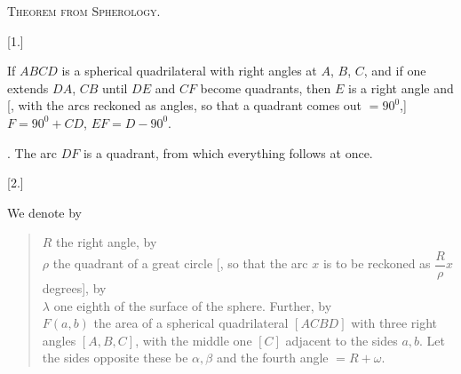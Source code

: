 \clearpage
{}%
\begin{center}
{\Large\textsc{Theorem from Spherology.}}
\end{center}

\begin{center}\begin{minipage}{\linewidth}\centering\end{minipage}\end{center}

[1.]

If $ABCD$ is a spherical quadrilateral with right angles at $A$, $B$, $C$, and if one extends $DA$, $CB$ until $DE$ and $CF$ become quadrants, then $E$ is a right angle and [, with the arcs reckoned as angles, so that a quadrant comes out $= 90^{0}$,] $F = 90^{0} + CD$, $EF = D - 90^{0}$.

. The arc $DF$ is a quadrant, from which everything follows at once.

[2.]

We denote by

\begin{quote}
$R$ the right angle, by\\
$\rho$ the quadrant of a great circle [, so that the arc $x$ is to be reckoned as $\dfrac{R}{\rho}x$ degrees], by\\
$\lambda$ one eighth of the surface of the sphere. Further, by\\
$F(a,b)$ the area of a spherical quadrilateral $[ACBD]$ with three right angles $[A, B, C]$, with the middle one $[C]$ adjacent to the sides $a, b$. Let the sides opposite these be $\alpha, \beta$ and the fourth angle $= R + \omega$.
\end{quote}
